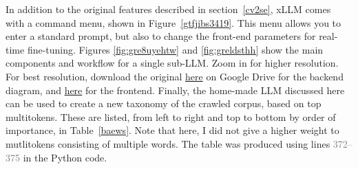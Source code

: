 \documentclass[10pt]{article}
\begin{document}
{In addition to the original features described in section~\ref{cv2se}, xLLM comes with a command menu, shown in Figure~\ref{gtfjibs3419}. This menu allows you to enter a standard prompt, but also to change
 the front-end parameters for \textcolor{index}{real-time fine-tuning}. 
Figures \ref{fig:gre8uyehtw} and \ref{fig:greldsthh} show the main components and workflow for a single sub-LLM. Zoom in for higher resolution. For best  resolution, download the original \href{https://drive.google.com/file/d/16as3x-PNnzjvczKVSZro3ir4bRVfb30j/}{here} on Google Drive for the backend diagram, and \href{https://drive.google.com/file/d/1eDS41Zqm8vLnDJdyIvUKfTvqLxKXTHNV/}{here} for the frontend.   
Finally, the home-made LLM discussed here can be used to create a new taxonomy of the crawled corpus, based on top multitokens. 
These are listed, from left to right and top to bottom by order of importance, in Table~\ref{baews}. Note that here, I did not give a higher weight to mutlitokens consisting of multiple words. The table was produced using lines \textcolor{gray}{372--375} in the Python code.


}
\end{document}
